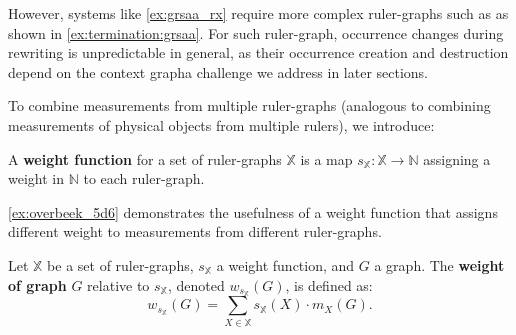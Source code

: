However, systems like \autoref{ex:grsaa_rx} require more complex ruler-graphs such as  as shown in \autoref{ex:termination:grsaa}.
    For such ruler-graph, occurrence changes during rewriting is unpredictable in general, as their occurrence creation and destruction depend on the context graph\textemdash a challenge we address in later sections.
    
To combine measurements from multiple ruler-graphs (analogous to combining measurements of physical objects from multiple rulers), we introduce:
\begin{definition}
    \label{def:weight_function}
    A \textbf{weight function} for a set of ruler-graphs \( \mathbb{X} \) is a map \( s_{\mathbb{X}} \colon \mathbb{X} \to \mathbb{N} \) assigning a weight in $\mathbb{N}$ to each ruler-graph.
\end{definition}
\autoref{ex:overbeek_5d6} demonstrates the usefulness of a weight function that assigns different weight to measurements from different ruler-graphs.
\begin{definition}
    \label{def:graph_weight}  
    Let \( \mathbb{X} \) be a set of ruler-graphs, 
    \( s_{\mathbb{X}} \) a weight function, and \( G \) a graph. The \textbf{weight of graph} \( G \) relative to \( s_{\mathbb{X}} \), denoted \( w_{s_{\mathbb{X}}}(G) \), is defined as: 
    \[
        w_{s_{\mathbb{X}}}(G) = \sum_{X \in \mathbb{X}} s_{\mathbb{X}}(X) \cdot m_X(G).  
    \]  
\end{definition}


